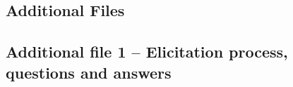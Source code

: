 \documentclass[]{bmcart}
\begin{document}
\begin{backmatter}



%



\newpage
\section*{Additional Files}

\subsection{Additional file 1 -- Elicitation process, questions and answers}


\end{backmatter}
\end{document}
